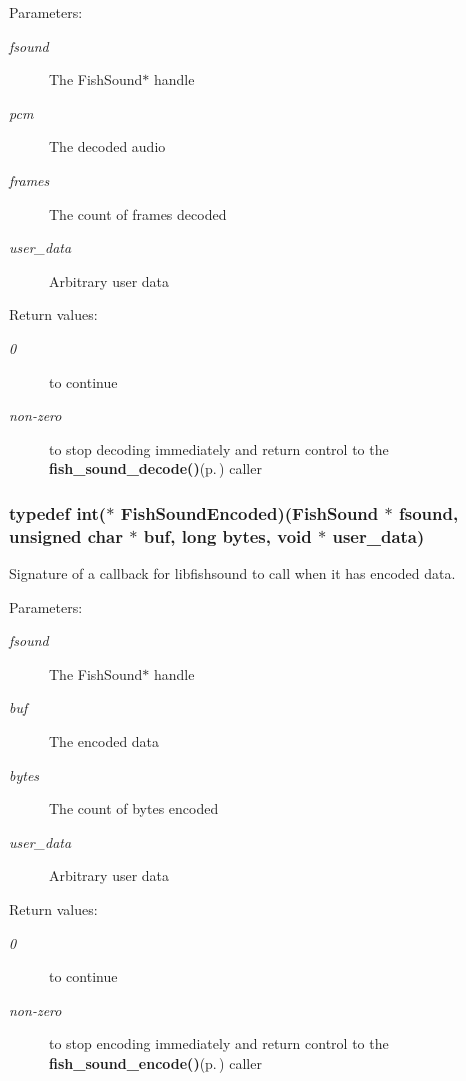 \begin{Desc}
\item[Parameters:]
\begin{description}
\item[{\em fsound}]The Fish\-Sound$\ast$ handle \item[{\em pcm}]The decoded audio \item[{\em frames}]The count of frames decoded \item[{\em user\_\-data}]Arbitrary user data \end{description}
\end{Desc}
\begin{Desc}
\item[Return values:]
\begin{description}
\item[{\em 0}]to continue \item[{\em non-zero}]to stop decoding immediately and return control to the {\bf fish\_\-sound\_\-decode()}{\rm (p.\,\pageref{fishsound_8h_a7})} caller \end{description}
\end{Desc}
\subsubsection{\setlength{\rightskip}{0pt plus 5cm}typedef int($\ast$ {\bf Fish\-Sound\-Encoded})({\bf Fish\-Sound} $\ast$ fsound, unsigned char $\ast$ buf, long bytes, void $\ast$ user\_\-data)}\label{fishsound_8h_a2}


Signature of a callback for libfishsound to call when it has encoded data. 

\begin{Desc}
\item[Parameters:]
\begin{description}
\item[{\em fsound}]The Fish\-Sound$\ast$ handle \item[{\em buf}]The encoded data \item[{\em bytes}]The count of bytes encoded \item[{\em user\_\-data}]Arbitrary user data \end{description}
\end{Desc}
\begin{Desc}
\item[Return values:]
\begin{description}
\item[{\em 0}]to continue \item[{\em non-zero}]to stop encoding immediately and return control to the {\bf fish\_\-sound\_\-encode()}{\rm (p.\,\pageref{fishsound_8h_a8})} caller \end{description}
\end{Desc}


